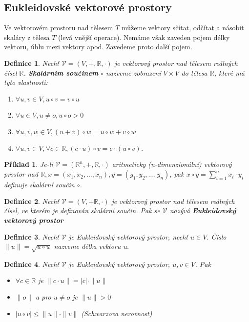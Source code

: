 \documentclass[12pt,a4paper]{article}
\newtheorem{definition}{Definice}
\newtheorem{example}{Příklad}
\begin{document}
\subsection{Eukleidovské vektorové prostory}
Ve vektorovém prostoru nad tělesem $T$ můžeme vektory sčítat, odčítat a násobit skaláry z tělesa $T$ (levá vnější operace). Nemáme však zaveden pojem délky vektoru, úhlu mezi vektory apod. Zavedeme proto další pojem.

\begin{definition}
	Nechť $\mathscr{V} = (V, +, \mathbb{R}, \cdot)$ je vektorový prostor nad tělesem reálných čísel $\mathbb{R}$. \textbf{Skalárním součinem} $\circ$ nazveme zobrazení $V \times V$ do tělesa $\mathbb{R}$, které má tyto vlastnosti:
	\begin{enumerate}
		\item $\forall u,v \in V, u \circ v = v \circ u$
		\item $\forall u \in V, u \not= o, u \circ o > 0$
		\item $\forall u,v,w \in V, (u + v) \circ w = u \circ w + v \circ w$
		\item $\forall u,v \in V, \forall c \in \mathbb{R}, (c \cdot u) \circ v = c \cdot (u \circ v)$.
	\end{enumerate}
\end{definition}

\begin{example}
	Je-li $\mathscr{V} = (\mathbb{R}^n, +, \mathbb{R}, \cdot)$ aritmeticky (n-dimenzionální) vektorový prostor nad $\mathbb{R}, x = (x_1,x_2, \dots, x_n), y = (y_1,y_2, \dots, y_n)$, pak $x \circ y = \sum^n_{i=1} x_i \cdot y_i$ definuje skalární součin $\circ$.
\end{example}

\begin{definition}
	Nechť $\mathscr{V} = (V, + \mathbb{R}, \cdot)$ je vektorový prostor nad tělesem reálných čísel, ve kterém je definován skalární součin. Pak se $\mathscr{V}$ nazývá \textbf{Eukleidovský vektorový prostor}
\end{definition}

\begin{definition}
	Nechť $\mathscr{V}$ je Eukleidovský vektorový prostor, nechť $u \in V$. Číslo $\| u \| = \sqrt{u \circ u}$ nazveme délka vektoru u.
\end{definition}

\begin{definition}
	Nechť $\mathscr{V}$ je Eukleidovský vektorový prostor, $u,v \in V$. Pak
	\begin{itemize}
		\item[a)] $\forall c \in \mathbb{R}$ je $\| c \cdot u \| = |c| \cdot \| u \|$
		\item[b)] $\| o \|$ a pro $u \not= o$ je $\| u \| > 0$
		\item[c)] $|u \circ v| \leq \| u \| \cdot \| v \|$ (Schwarzova nerovnost)
	\end{itemize}
\end{definition}
\end{document}
